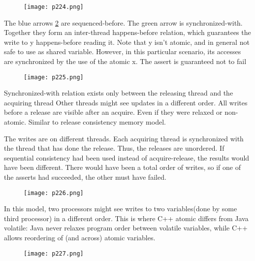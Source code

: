  \begin{figure}[H]
    \centering
    \texttt{[image: p224.png]}
    \caption{}
    \label{fig:p224}
\end{figure}




The blue arrows \ref{fig:p225} are sequenced-before. The green arrow is synchronized-with. 
Together they form an inter-thread happens-before relation, 
which guarantees the write to y happens-before reading it.
Note that y isn’t atomic, and in general not safe to use as shared variable. 
However, in this particular scenario, its accesses are synchronized by the use of the atomic x.
The assert is guaranteed not to fail

\begin{figure}[H]
    \centering
    \texttt{[image: p225.png]}
    \caption{}
    \label{fig:p225}
\end{figure}


Synchronized-with relation exists only between the releasing thread and the acquiring thread
Other threads might see updates in a different order.
All writes before a release are visible after an acquire.
Even if they were relaxed or non-atomic.
Similar to release consistency memory model.






The writes are on different threads. Each acquiring thread is synchronized with 
the thread that has done the release. Thus, the releases are unordered.
If sequential consistency had been used instead of acquire-release,
 the results would have been different. 
 There would have been a total order of writes, so if one of the asserts had succeeded, 
 the other must have failed.

 \begin{figure}[H]
    \centering
    \texttt{[image: p226.png]}
    \caption{}
    \label{fig:p226}
\end{figure}




In this model, two processors might see writes to two variables(done by some third processor) 
in a different order.
This is where C++ atomic differs from Java volatile: Java never relaxes program order between 
volatile variables, while C++ allows reordering of (and across) atomic variables.



\begin{figure}[H]
    \centering
    \texttt{[image: p227.png]}
    \caption{}
    \label{fig:p227}
\end{figure}

